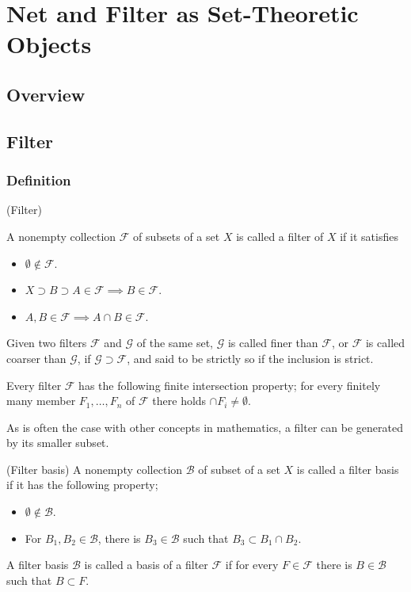 \documentclass{report}
\begin{document}
\section{Net and Filter as Set-Theoretic Objects}

\subsection{Overview}

\subsection{Filter}
\subsubsection{Definition}
\begin{dfn} (Filter)

    A nonempty collection \( \mathscr{F} \) of subsets of a set \( X \) is called a filter of \( X \) if it satisfies
    \begin{itemize}
        \item \( \emptyset \notin \mathscr{F} \).
        \item \( X \supset B \supset A \in \mathscr{F} \implies B \in \mathscr{F}\).
        \item \( A, B \in \mathscr{F} \implies A \cap B \in \mathscr{F}\).
    \end{itemize}

    Given two filters \( \mathscr{F} \) and \( \mathscr{G} \) of the same set, \( \mathscr{G} \) is called finer than \( \mathscr{F} \), or \( \mathscr{F} \) is called coarser than \( \mathscr{G} \), if \( \mathscr{G} \supset \mathscr{F}\), and said to be strictly so if the inclusion is strict.
\end{dfn}

\begin{rem}
    Every filter \( \mathscr{F} \) has the following finite intersection property; for every finitely many member \( F_1 ,\ldots, F_n \) of \( \mathscr{F} \) there holds \( \cap F_i \neq \emptyset \).
\end{rem}

As is often the case with other concepts in mathematics, a filter can be generated by its smaller subset.
\begin{dfn} (Filter basis)
    A nonempty collection \( \mathscr{B} \) of subset of a set \( X \) is called a filter basis if it has the following property;
    \begin{itemize}
        \item \( \emptyset \notin \mathscr{B} \).
        \item For \( B_1, B_2 \in \mathscr{B} \), there is \( B_3 \in \mathscr{B} \) such that \( B_3 \subset B_1 \cap B_2 \).
    \end{itemize}

    A filter basis \( \mathscr{B} \) is called a basis of a filter \( \mathscr{F}  \) if for every \( F \in \mathscr{F} \) there is \( B \in \mathscr{B} \) such that \( B \subset F \).
\end{dfn}
\end{document}

